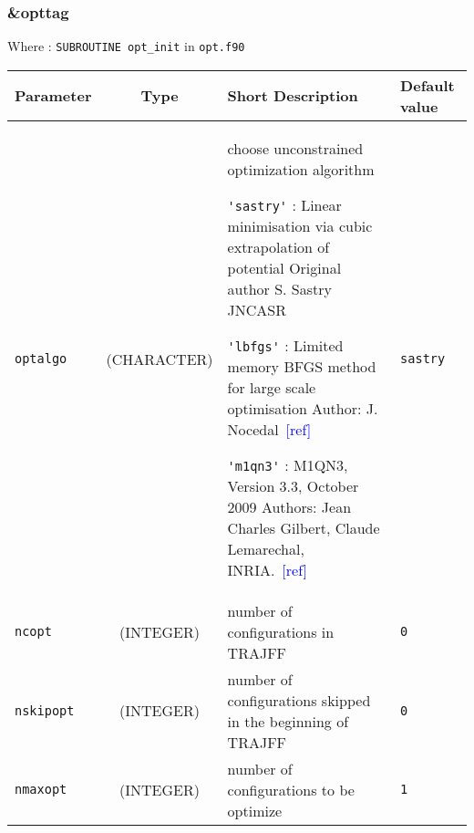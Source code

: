 \documentclass[a4paper]{article}
\newcommand{\addref}{\textcolor{blue}{[ref]}}
\begin{document}
\subsubsection{\&opttag}

Where : \verb?SUBROUTINE opt_init? in \verb?opt.f90?
\newline

\begin{longtable}{l|c|m{8cm}|m{2cm}}
\hline
\hline
Parameter        &  Type              &          Short Description                                                          & Default value \\
\hline
\hline
\rule[-0.75cm]{0cm}{1.5cm}
\verb?optalgo?   & (CHARACTER)        & \newline choose unconstrained optimization algorithm \newline 

                                        \verb?'sastry'? : Linear minimisation via cubic extrapolation of potential 
					Original author S. Sastry JNCASR \newline

					\verb?'lbfgs'? : Limited memory BFGS method for large scale optimisation
					Author: J. Nocedal~\addref  \newline 
					 
					\verb?'m1qn3'? : M1QN3, Version 3.3, October 2009
					Authors: Jean Charles Gilbert, Claude Lemarechal, INRIA.~\addref \newline            & \verb?sastry? \tabularnewline
\hline
\rule[-0.75cm]{0cm}{1.5cm}
\verb?ncopt?     & (INTEGER)          & number of configurations in TRAJFF                                                   & \verb?0? \\
\hline
\rule[-0.75cm]{0cm}{1.5cm}
\verb?nskipopt?  & (INTEGER)          & number of configurations skipped in the beginning of TRAJFF                          & \verb?0? \\
\hline
\rule[-0.75cm]{0cm}{1.5cm}
\verb?nmaxopt?   & (INTEGER)          & number of configurations to be optimize                                              & \verb?1? \\
\hline
\hline
\end{longtable}

\end{document}
